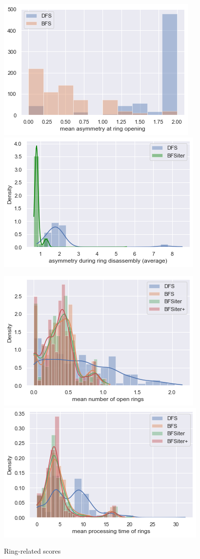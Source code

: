 \begin{figure}
	
	\includegraphics[scale=0.8]{mean_ass_beginn_bfs}\includegraphics[scale=0.8]{mean_ass_total_onlyiter}
	
	\includegraphics[scale=0.8]{mean_open_rings_all}\includegraphics[scale=0.8]{mean_processing_all}
	
	\caption{Ring-related scores}
	
\end{figure}

